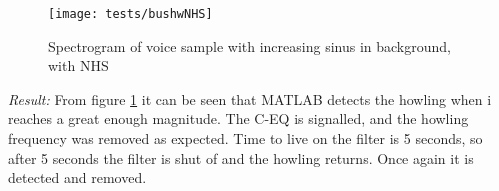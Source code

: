 \begin{figure}[H]
\centering
\texttt{[image: tests/bushwNHS]}
\caption{Spectrogram of voice sample with increasing sinus in background, with NHS}
\label{figure:spectrogram_NHS}
\end{figure}

\emph{Result:}
From figure \ref{figure:spectrogram_NHS} it can be seen that MATLAB detects the howling when i reaches a great enough magnitude. The C-EQ is signalled, and the howling frequency was removed as expected. Time to live on the filter is 5 seconds, so after 5 seconds the filter is shut of and the howling returns. Once again it is detected and removed.

